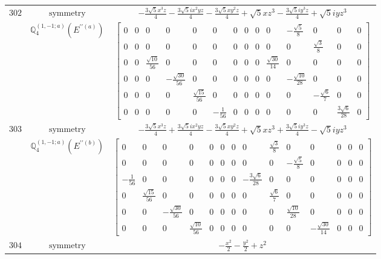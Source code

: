 \documentclass[fleqn,8pt,landscape]{jsarticle}
\begin{document}
\begin{longtable}{ccc}
$ 302 $ & $ \text{symmetry} $ & $ - \frac{3 \sqrt{5} x^{3} z}{4} - \frac{3 \sqrt{5} i x^{2} y z}{4} - \frac{3 \sqrt{5} x y^{2} z}{4} + \sqrt{5} x z^{3} - \frac{3 \sqrt{5} i y^{3} z}{4} + \sqrt{5} i y z^{3} $ \\
$  $ & $ \mathbb{Q}_{4}^{(1,-1;a)}(E^{\prime\prime(a)}) $ & $ \begin{bmatrix} 0 & 0 & 0 & 0 & 0 & 0 & 0 & 0 & 0 & 0 & - \frac{\sqrt{5}}{8} & 0 & 0 & 0 \\ 0 & 0 & 0 & 0 & 0 & 0 & 0 & 0 & 0 & 0 & 0 & \frac{\sqrt{3}}{8} & 0 & 0 \\ 0 & 0 & \frac{\sqrt{10}}{56} & 0 & 0 & 0 & 0 & 0 & 0 & \frac{\sqrt{30}}{14} & 0 & 0 & 0 & 0 \\ 0 & 0 & 0 & - \frac{\sqrt{30}}{56} & 0 & 0 & 0 & 0 & 0 & 0 & - \frac{\sqrt{10}}{28} & 0 & 0 & 0 \\ 0 & 0 & 0 & 0 & \frac{\sqrt{15}}{56} & 0 & 0 & 0 & 0 & 0 & 0 & - \frac{\sqrt{6}}{7} & 0 & 0 \\ 0 & 0 & 0 & 0 & 0 & - \frac{1}{56} & 0 & 0 & 0 & 0 & 0 & 0 & \frac{3 \sqrt{6}}{28} & 0 \end{bmatrix} $ \\ \hline
$ 303 $ & $ \text{symmetry} $ & $ - \frac{3 \sqrt{5} x^{3} z}{4} + \frac{3 \sqrt{5} i x^{2} y z}{4} - \frac{3 \sqrt{5} x y^{2} z}{4} + \sqrt{5} x z^{3} + \frac{3 \sqrt{5} i y^{3} z}{4} - \sqrt{5} i y z^{3} $ \\
$  $ & $ \mathbb{Q}_{4}^{(1,-1;a)}(E^{\prime\prime(b)}) $ & $ \begin{bmatrix} 0 & 0 & 0 & 0 & 0 & 0 & 0 & 0 & \frac{\sqrt{3}}{8} & 0 & 0 & 0 & 0 & 0 \\ 0 & 0 & 0 & 0 & 0 & 0 & 0 & 0 & 0 & - \frac{\sqrt{5}}{8} & 0 & 0 & 0 & 0 \\ - \frac{1}{56} & 0 & 0 & 0 & 0 & 0 & 0 & - \frac{3 \sqrt{6}}{28} & 0 & 0 & 0 & 0 & 0 & 0 \\ 0 & \frac{\sqrt{15}}{56} & 0 & 0 & 0 & 0 & 0 & 0 & \frac{\sqrt{6}}{7} & 0 & 0 & 0 & 0 & 0 \\ 0 & 0 & - \frac{\sqrt{30}}{56} & 0 & 0 & 0 & 0 & 0 & 0 & \frac{\sqrt{10}}{28} & 0 & 0 & 0 & 0 \\ 0 & 0 & 0 & \frac{\sqrt{10}}{56} & 0 & 0 & 0 & 0 & 0 & 0 & - \frac{\sqrt{30}}{14} & 0 & 0 & 0 \end{bmatrix} $ \\ \hline
$ 304 $ & $ \text{symmetry} $ & $ - \frac{x^{2}}{2} - \frac{y^{2}}{2} + z^{2} $ \\

\end{longtable}
\end{document}
